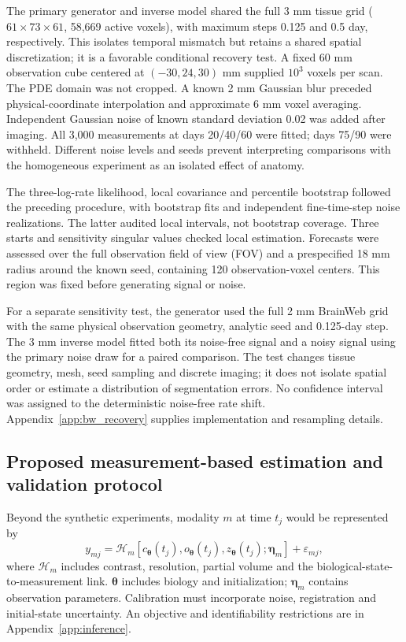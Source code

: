 The primary generator and inverse model shared the full 3 mm tissue grid ($61\times73\times61$, 58,669 active voxels), with maximum steps 0.125 and 0.5 day, respectively. This isolates temporal mismatch but retains a shared spatial discretization; it is a favorable conditional recovery test. A fixed 60 mm observation cube centered at $(-30,24,30)$ mm supplied $10^3$ voxels per scan. The PDE domain was not cropped. A known 2 mm Gaussian blur preceded physical-coordinate interpolation and approximate 6 mm voxel averaging. Independent Gaussian noise of known standard deviation 0.02 was added after imaging. All 3,000 measurements at days 20/40/60 were fitted; days 75/90 were withheld. Different noise levels and seeds prevent interpreting comparisons with the homogeneous experiment as an isolated effect of anatomy.

The three-log-rate likelihood, local covariance and percentile bootstrap followed the preceding procedure, with \BWBootstraps{} bootstrap fits and \BWTrials{} independent fine-time-step noise realizations. The latter audited local intervals, not bootstrap coverage. Three starts and sensitivity singular values checked local estimation. Forecasts were assessed over the full observation field of view (FOV) and a prespecified 18 mm radius around the known seed, containing 120 observation-voxel centers. This region was fixed before generating signal or noise.

For a separate sensitivity test, the generator used the full 2 mm BrainWeb grid with the same physical observation geometry, analytic seed and 0.125-day step. The 3 mm inverse model fitted both its noise-free signal and a noisy signal using the primary noise draw for a paired comparison. The test changes tissue geometry, mesh, seed sampling and discrete imaging; it does not isolate spatial order or estimate a distribution of segmentation errors. No confidence interval was assigned to the deterministic noise-free rate shift. Appendix~\ref{app:bw_recovery} supplies implementation and resampling details.




\subsection{Proposed measurement-based estimation and validation protocol}
Beyond the synthetic experiments, modality $m$ at time $t_j$ would be represented by
\begin{equation}
 y_{mj}=\mathcal H_m[c_{\boldsymbol\theta}(t_j),o_{\boldsymbol\theta}(t_j),z_{\boldsymbol\theta}(t_j);\boldsymbol\eta_m]+\varepsilon_{mj},\label{eq:observation}
\end{equation}
where $\mathcal H_m$ includes contrast, resolution, partial volume and the biological-state-to-measurement link. $\boldsymbol\theta$ includes biology and initialization; $\boldsymbol\eta_m$ contains observation parameters. Calibration must incorporate noise, registration and initial-state uncertainty. An objective and identifiability restrictions are in Appendix~\ref{app:inference}.

